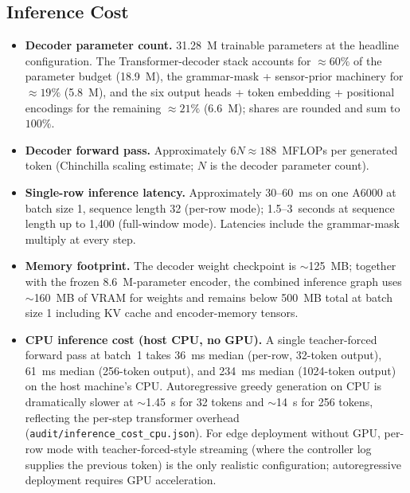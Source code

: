 \subsection{Inference Cost}
\label{app:repl-inference}

\begin{itemize}
\item \textbf{Decoder parameter count.} 31.28~M trainable parameters at
the headline configuration. The Transformer-decoder stack accounts for
$\approx\!60\%$ of the parameter budget (18.9~M), the grammar-mask +
sensor-prior machinery for $\approx\!19\%$ (5.8~M), and the six output
heads + token embedding + positional encodings for the remaining
$\approx\!21\%$ (6.6~M); shares are rounded and sum to $100\%$.
\item \textbf{Decoder forward pass.} Approximately $6N \approx 188$~MFLOPs
per generated token (Chinchilla scaling estimate; $N$ is the decoder
parameter count).
\item \textbf{Single-row inference latency.} Approximately 30--60~ms on
one A6000 at batch size 1, sequence length 32 (per-row mode);
1.5--3~seconds at sequence length up to 1{,}400 (full-window mode).
Latencies include the grammar-mask multiply at every step.
\item \textbf{Memory footprint.} The decoder weight checkpoint is
$\sim$125~MB; together with the frozen 8.6~M-parameter encoder, the
combined inference graph uses $\sim$160~MB of VRAM for weights and
remains below 500~MB total at batch size 1 including KV cache and
encoder-memory tensors.
\item \textbf{CPU inference cost (host CPU, no GPU).} A single
teacher-forced forward pass at batch~1 takes 36~ms median (per-row,
32-token output), 61~ms median (256-token output), and 234~ms median
(1024-token output) on the host machine's CPU. Autoregressive greedy
generation on CPU is dramatically slower at $\sim$1.45~s for 32 tokens
and $\sim$14~s for 256 tokens, reflecting the per-step transformer
overhead (\texttt{audit/\allowbreak inference\_cost\_cpu.json}). For edge deployment
without GPU, per-row mode with teacher-forced-style streaming (where
the controller log supplies the previous token) is the only realistic
configuration; autoregressive deployment requires GPU acceleration.
\end{itemize}
